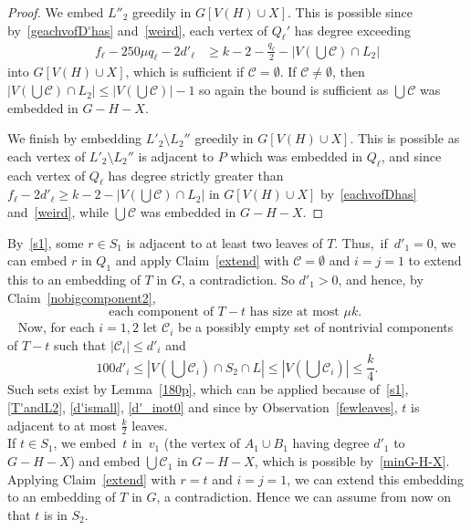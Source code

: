 \documentclass[12pt]{article}
\begin{document}
\begin{proof}
We  embed $L''_2$ greedily in $G[V(H)\cup X]$. This is possible since by~\eqref{geachvofD'has} and~\eqref{weird}, each vertex of $Q_\ell'$ has degree exceeding 
\begin{align*}
    f_\ell-250\mu q_\ell-2d'_\ell
& \ge k-2-\frac{q_\ell}2-|V(\bigcup\mathcal C)\cap L_2|
\end{align*} into $G[V(H)\cup X]$, which is
sufficient if $\mathcal C=\emptyset$. If $\mathcal C\neq\emptyset$, then   $|V(\bigcup\mathcal C)\cap L_2| \le |V(\bigcup\mathcal C)|-1$  so again the bound is sufficient as $\bigcup\mathcal C$ was embedded in $G-H-X$. 



We finish by embedding  $L'_2\setminus L_2''$ greedily in $G[V(H)\cup X]$. This is possible as each vertex of $L'_2\setminus L_2''$ is adjacent to $P$  which was embedded in $Q_\ell$, and since each vertex of $Q_\ell$ has degree  strictly greater than $f_\ell-2d'_\ell\ge k-2-|V(\bigcup\mathcal C)\cap L_2|$ 
in $G[V(H)\cup X]$
   by~\eqref{eachvofDhas} and~\eqref{weird}, while $\bigcup\mathcal C$ was embedded in $G-H-X$.
  \end{proof}


By~\eqref{s1}, some $r\in S_1$ is adjacent to at least two leaves of $T$. 
Thus,~if~$d'_1=0$, we can embed $r$ in $Q_1$ 
and apply Claim~\ref{extend} with $\mathcal C=\emptyset$ and $i=j=1$ to extend this to an embedding of $T$ in $G$, a contradiction. So $d'_1> 0$, and hence,  by Claim~\ref{nobigcomponent2}, 
\begin{equation}\label{d'_inot0} 
    \text{each component of $T-t$ has size at most $\mu k$. }
\end{equation}
\

Now, 
for each $i=1,2$  
let $\mathcal C_i$ be a possibly empty set of  nontrivial components of $T-t$ such that $|\mathcal C_i|\le d'_i$ and $$100 d'_i
    \le 
    |V(\bigcup \mathcal C_i)\cap S_2\cap L|
    \le |V(\bigcup \mathcal C_i)|\le \frac k4.$$
Such  sets exist
      by Lemma~\ref{180p}, 
      which can be applied
because of~\eqref{s1}, \eqref{T'andL2}, \eqref{d'ismall},  \eqref{d'_inot0} 
and
since by 
Observation~\ref{fewleaves}, $t$ is adjacent to at most $\frac k2$ leaves.
\\
If  $t \in S_1$,
we embed~$t$ in~$v_1$ (the vertex of $A_1\cup B_1$ having degree $d'_1$ to $G-H-X$)
and embed $\bigcup\mathcal C_1$ in $G-H-X$, which is possible by~\eqref{minG-H-X}. 
Applying Claim~\ref{extend} with $r=t$ and $i=j=1$,  we can extend this embedding to an embedding of $T$ in $G$, a contradiction. 
Hence we can assume from now on that 
$t$ is in $S_2$. 
\end{document}

